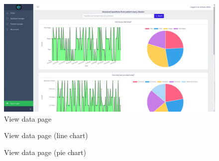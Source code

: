 \documentclass[12pt,english]{article}
\begin{document}
\begin{figure}[H]
  \centering
    \includegraphics[width=\textwidth]{view_data.png}
  \caption{View data page}
\end{figure}
\vspace{5cm}
\begin{figure}[H]
    \caption{View data page (line chart)}
\end{figure}

\begin{figure}[H]
    \caption{View data page (pie chart)}
\end{figure}
\end{document}
